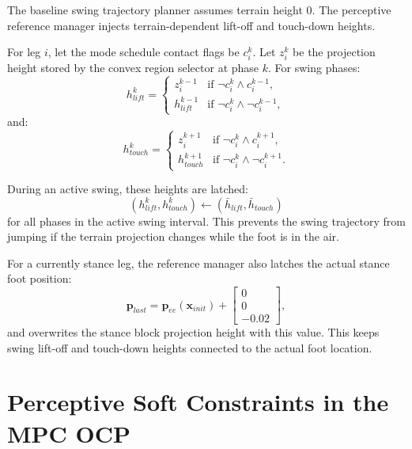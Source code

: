 \documentclass[11pt,a4paper]{article}
\begin{document}
The baseline swing trajectory planner assumes terrain height $0$. The perceptive reference manager injects terrain-dependent lift-off and touch-down heights.

For leg $i$, let the mode schedule contact flags be $c_i^k$. Let $z_i^k$ be the projection height stored by the convex region selector at phase $k$. For swing phases:
\begin{equation}
	h_{lift}^k
	=
	\begin{cases}
		z_i^{k-1} & \text{if } \neg c_i^k \land c_i^{k-1},\\
		h_{lift}^{k-1} & \text{if } \neg c_i^k \land \neg c_i^{k-1},
	\end{cases}
\end{equation}
and:
\begin{equation}
	h_{touch}^k
	=
	\begin{cases}
		z_i^{k+1} & \text{if } \neg c_i^k \land c_i^{k+1},\\
		h_{touch}^{k+1} & \text{if } \neg c_i^k \land \neg c_i^{k+1}.
	\end{cases}
\end{equation}

During an active swing, these heights are latched:
\begin{equation}
	(h_{lift}^k,h_{touch}^k)
	\leftarrow
	(\bar{h}_{lift},\bar{h}_{touch})
\end{equation}
for all phases in the active swing interval. This prevents the swing trajectory from jumping if the terrain projection changes while the foot is in the air.

For a currently stance leg, the reference manager also latches the actual stance foot position:
\begin{equation}
	\bm{p}_{last}
	=
	\bm{p}_{ee}(\bm{x}_{init})
	+
	\begin{bmatrix}
		0\\0\\-0.02
	\end{bmatrix},
\end{equation}
and overwrites the stance block projection height with this value. This keeps swing lift-off and touch-down heights connected to the actual foot location.


\section{Perceptive Soft Constraints in the MPC OCP}
\label{sec:perceptive_constraints}
\end{document}
